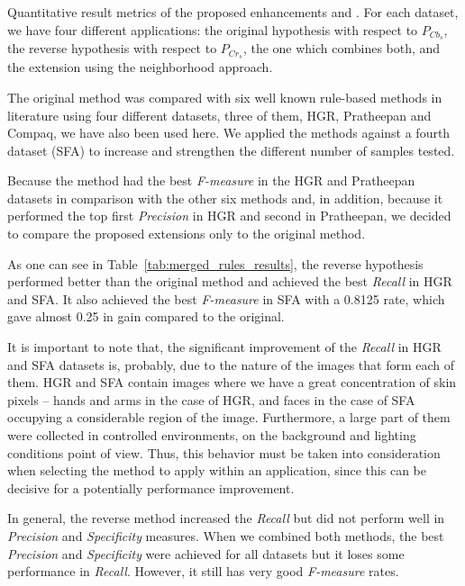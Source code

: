 \begin{table*}[ht]
\caption[Quantitative result metrics of the proposed enhancements and original method]{Quantitative result metrics of the proposed enhancements and \citet{brancati:17}. For each dataset, we have four different applications: the original hypothesis with respect to $P_{Cb_{s}}$, the reverse hypothesis with respect to $P_{Cr_{s}}$, the one which combines both, and the extension using the neighborhood approach.}
\label{tab:merged_rules_results}

\end{table*}

The original method was compared with six well known rule-based methods in literature using four different datasets, three of them, HGR, Pratheepan and Compaq, we have also been used here. We applied the methods against a fourth dataset (SFA) to increase and strengthen the different number of samples tested.

Because the method had the best \textit{F-measure} in the HGR and Pratheepan datasets in comparison with the other six methods and, in addition, because it performed the top first \textit{Precision} in HGR and  second in Pratheepan, we decided to compare the proposed extensions only to the original method.

As one can see in Table~\ref{tab:merged_rules_results}, the reverse hypothesis performed better than the original method and achieved the best \textit{Recall} in HGR and SFA. It also achieved the best \textit{F-measure} in SFA with a 0.8125 rate, which gave almost 0.25 in gain compared to the original.

It is important to note that, the significant improvement of the \textit{Recall} in HGR and SFA datasets is, probably, due to the nature of the images that form each of them. HGR and SFA contain images where we have a great concentration of skin pixels -- hands and arms in the case of HGR, and faces in the case of SFA occupying a considerable region of the image. Furthermore, a large part of them were collected in controlled environments, on the background and lighting conditions point of view. Thus, this behavior must be taken into consideration when selecting the method to apply within an application, since this can be decisive for a potentially performance improvement.

In general, the reverse method increased the \textit{Recall} but did not perform well in \textit{Precision} and \textit{Specificity} measures. When we combined both methods, the best \textit{Precision} and \textit{Specificity} were achieved for all datasets but it loses some performance in \textit{Recall}. However, it still has very good \textit{F-measure} rates.

